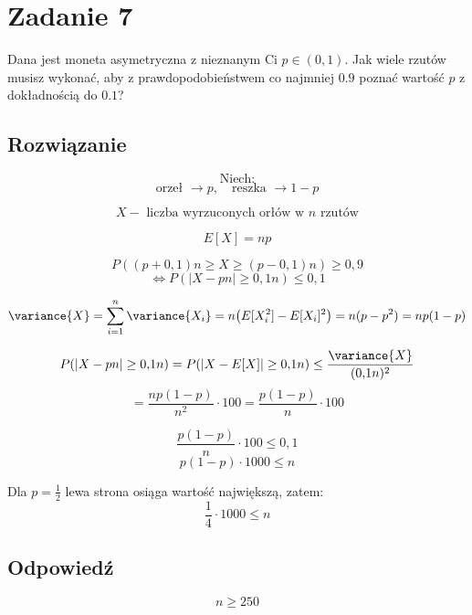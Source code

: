\section{Zadanie 7}
Dana jest moneta asymetryczna z nieznanym Ci \( p \in (0, 1) \).
Jak wiele rzutów musisz wykonać, aby z prawdopodobieństwem co najmniej \( 0.9 \) poznać wartość \( p \) z dokładnością do \( 0.1 \)?

\subsection*{Rozwiązanie}
\[
	\text{Niech:}
\]
\[
	\text{orzeł } \rightarrow p, \quad \text{reszka } \rightarrow 1 - p
\]

\[
	X - \text{ liczba wyrzuconych orłów w } n \text{ rzutów}
\]

\[
	E[X] = np
\]

\[
	P((p+0{,}1)n \geq X \geq (p-0{,}1)n) \geq 0{,}9
\]
\[
	\Leftrightarrow P(|X - pn| \geq 0{,}1n) \leq 0{,}1
\]

\[
	\variance{X} = \sum_{i=1}^{n} \variance{X_i} = n \big(E[X_i^2] - E[X_i]^2\big) = n(p - p^2) = np(1 - p)
\]

\[
	P(|X - pn| \geq 0{,}1n) = P(|X - E[X]| \geq 0{,}1n) \leq \frac{\variance{X}}{(0{,}1n)^2}
\]
\[
	= \frac{np(1 - p)}{n^2} \cdot 100 = \frac{p(1 - p)}{n} \cdot 100
\]

\[
	\frac{p(1 - p)}{n} \cdot 100 \leq 0{,}1
\]
\[
	p(1 - p) \cdot 1000 \leq n
\]

Dla \( p = \frac{1}{2} \) lewa strona osiąga wartość największą, zatem:
\[
	\frac{1}{4} \cdot 1000 \leq n
\]


\subsection*{Odpowiedź}
\[
	\boxed{n \geq 250}
\]
